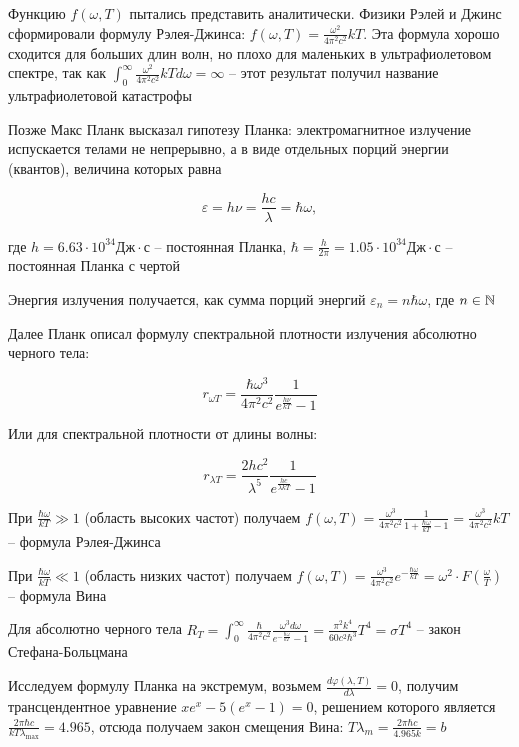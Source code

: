 \documentclass[12pt]{article}
\begin{document}
Функцию $f(\omega, T)$ пытались представить аналитически. Физики Рэлей и Джинс сформировали формулу Рэлея-Джинса: $f(\omega, T) = \frac{\omega^2}{4\pi^2 c^2} kT$. Эта формула хорошо сходится для больших длин волн, но плохо для маленьких в ультрафиолетовом спектре, так как $\int_0^\infty \frac{\omega^2}{4\pi^2 c^2} kT d\omega = \infty$ -- этот результат получил название ультрафиолетовой катастрофы

Позже Макс Планк высказал гипотезу Планка: электромагнитное излучение испускается телами не непрерывно, а в виде отдельных порций энергии (квантов), величина которых равна 

\[\varepsilon = h \nu = \frac{h c}{\lambda} = \hbar \omega,\]

где $h = 6.63 \cdot 10^{34} \text{Дж}\cdot\text{с}$ -- постоянная Планка, $\hbar = \frac{h}{2\pi} = 1.05 \cdot 10^{34} \text{Дж}\cdot\text{с}$ -- постоянная Планка с чертой

Энергия излучения получается, как сумма порций энергий $\varepsilon_n = n \hbar \omega$, где $n \in \mathbb{N}$

Далее Планк описал формулу спектральной плотности излучения абсолютно черного тела:

\[r_{\omega T} = \frac{\hbar \omega^3}{4 \pi^2 c^2} \frac{1}{e^{\frac{h\nu}{kT}} - 1}\]

Или для спектральной плотности от длины волны:

\[r_{\lambda T} = \frac{2 h c^2}{\lambda^5} \frac{1}{e^{\frac{hc}{\lambda kT}} - 1}\]

При $\frac{\hbar \omega}{kT} \gg 1$ (область высоких частот) получаем $f(\omega, T) = \frac{\omega^3}{4\pi^2 c^2} \frac{1}{1 + \frac{\hbar \omega}{kT} - 1} = \frac{\omega^3}{4\pi^2 c^2} kT$ -- формула Рэлея-Джинса

При $\frac{\hbar \omega}{kT} \ll 1$ (область низких частот) получаем $f(\omega, T) = \frac{\omega^3}{4\pi^2 c^2} e^{-\frac{\hbar \omega}{k T}} = \omega^2 \cdot F\left(\frac{\omega}{T}\right)$ -- формула Вина

Для абсолютно черного тела $R_T = \int_0^\infty \frac{\hbar}{4\pi^2 c^2} \frac{\omega^3 d\omega}{e^{-\frac{\hbar \omega}{k T}} - 1} = \frac{\pi^2 k^4}{60 c^2 \hbar^3} T^4 = \sigma T^4$ -- закон Стефана-Больцмана

\smallvspace 

Исследуем формулу Планка на экстремум, возьмем $\frac{d \varphi(\lambda, T)}{d\lambda} = 0$, получим трансцендентное уравнение $x e^x - 5(e^x - 1) = 0$, решением которого является $\frac{2\pi \hbar c}{k T \lambda_{\max}} = 4.965$, отсюда получаем закон смещения Вина: $T \lambda_m = \frac{2\pi \hbar c}{4.965 k} = b$
\end{document}
